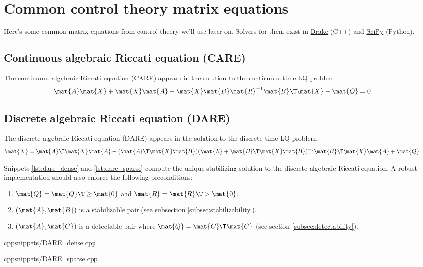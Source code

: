 \section{Common control theory matrix equations}

Here's some common matrix equations from control theory we'll use later on.
Solvers for them exist in \href{https://github.com/RobotLocomotion/drake}{Drake}
(C++) and \href{https://github.com/scipy/scipy}{SciPy} (Python).

\subsection{Continuous algebraic Riccati equation (CARE)}

The continuous algebraic Riccati equation (CARE) appears in the solution to the
continuous time LQ problem.
\begin{equation}
  \mat{A}\mat{X} + \mat{X}\mat{A} - \mat{X}\mat{B}\mat{R}^{-1}\mat{B}\T\mat{X} +
    \mat{Q} = 0
\end{equation}

\subsection{Discrete algebraic Riccati equation (DARE)}
\label{subsec:dare}

The discrete algebraic Riccati equation (DARE) appears in the solution to the
discrete time LQ problem.
\begin{equation}
  \mat{X} = \mat{A}\T\mat{X}\mat{A} - (\mat{A}\T\mat{X}\mat{B})(\mat{R} +
    \mat{B}\T\mat{X}\mat{B})^{-1} \mat{B}\T\mat{X}\mat{A} + \mat{Q}
\end{equation}

Snippets \ref{lst:dare_dense} and \ref{lst:dare_sparse} compute the unique
stabilizing solution to the discrete algebraic Riccati equation. A robust
implementation should also enforce the following preconditions:
\begin{enumerate}
  \item $\mat{Q} = \mat{Q}\T \geq \mat{0}$ and $\mat{R} = \mat{R}\T > \mat{0}$.
  \item $(\mat{A}, \mat{B})$ is a stabilizable pair (see subsection
    \ref{subsec:stabilizability}).
  \item $(\mat{A}, \mat{C})$ is a detectable pair where
    $\mat{Q} = \mat{C}\T\mat{C}$ (see section \ref{subsec:detectability}).
\end{enumerate}
\begin{coderemote}{cpp}{snippets/DARE_dense.cpp}
  \caption{Dense discrete algebraic Riccati equation solver in C++}
  \label{lst:dare_dense}
\end{coderemote}
\begin{coderemote}{cpp}{snippets/DARE_sparse.cpp}
  \caption{Sparse discrete algebraic Riccati equation solver in C++}
  \label{lst:dare_sparse}
\end{coderemote}

